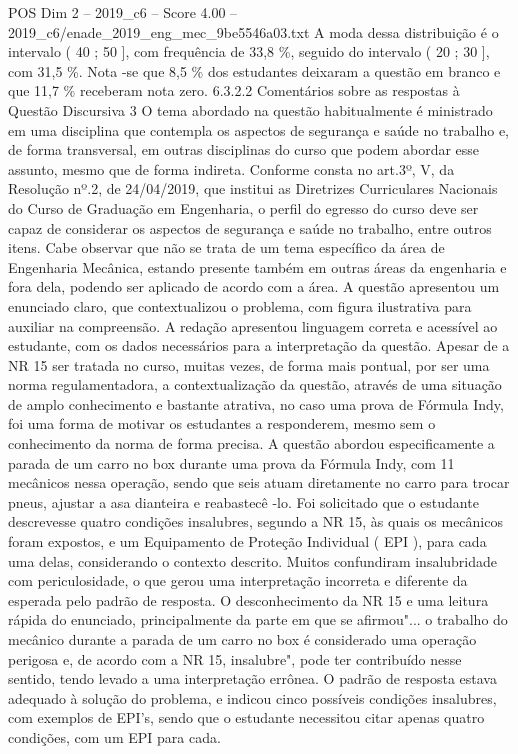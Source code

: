 \begin{textsample}{POS Dim 2 – 2019\_c6 – Score 4.00 – 2019\_c6/enade\_2019\_eng\_mec\_9be5546a03.txt}
A moda dessa distribuição é o intervalo ( 40 ; 50 ], com frequência de 33,8 \%, seguido do intervalo ( 20 ; 30 ], com 31,5 \%.
Nota -se que 8,5 \% dos estudantes deixaram a questão em branco e que 11,7 \% receberam nota zero. 6.3.2.2 Comentários sobre as respostas à Questão Discursiva 3 O tema abordado na questão habitualmente é ministrado em uma disciplina que contempla os aspectos de segurança e saúde no trabalho e, de forma transversal, em outras disciplinas do curso que podem abordar esse assunto, mesmo que de forma indireta.
Conforme consta no art.3º, V, da Resolução nº.2, de 24/04/2019, que institui as Diretrizes Curriculares Nacionais do Curso de Graduação em Engenharia, o perfil do egresso do curso deve ser capaz de considerar os aspectos de segurança e saúde no trabalho, entre outros itens.
Cabe observar que não se trata de um tema específico da área de Engenharia Mecânica, estando presente também em outras áreas da engenharia e fora dela, podendo ser aplicado de acordo com a área.
A questão apresentou um enunciado claro, que contextualizou o problema, com figura ilustrativa para auxiliar na compreensão.
A redação apresentou linguagem correta e acessível ao estudante, com os dados necessários para a interpretação da questão.
Apesar de a NR 15 ser tratada no curso, muitas vezes, de forma mais pontual, por ser uma norma regulamentadora, a contextualização da questão, através de uma situação de amplo conhecimento e bastante atrativa, no caso uma prova de Fórmula Indy, foi uma forma de motivar os estudantes a responderem, mesmo sem o conhecimento da norma de forma precisa.
A questão abordou especificamente a parada de um carro no box durante uma prova da Fórmula Indy, com 11 mecânicos nessa operação, sendo que seis atuam diretamente no carro para trocar pneus, ajustar a asa dianteira e reabastecê -lo.
Foi solicitado que o estudante descrevesse quatro condições insalubres, segundo a NR 15, às quais os mecânicos foram expostos, e um Equipamento de Proteção Individual ( EPI ), para cada uma delas, considerando o contexto descrito.
Muitos confundiram insalubridade com periculosidade, o que gerou uma interpretação incorreta e diferente da esperada pelo padrão de resposta.
O desconhecimento da NR 15 e uma leitura rápida do enunciado, principalmente da parte em que se afirmou"... o trabalho do mecânico durante a parada de um carro no box é considerado uma operação perigosa e, de acordo com a NR 15, insalubre", pode ter contribuído nesse sentido, tendo levado a uma interpretação errônea.
O padrão de resposta estava adequado à solução do problema, e indicou cinco possíveis condições insalubres, com exemplos de EPI’s, sendo que o estudante necessitou citar apenas quatro condições, com um EPI para cada.

\end{textsample}
